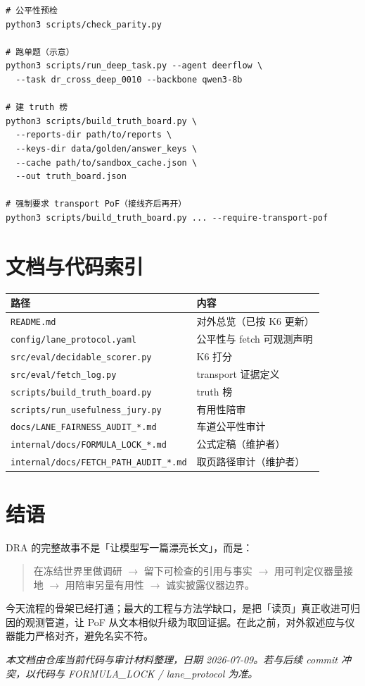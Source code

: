 \documentclass[11pt,a4paper]{article}
\begin{document}
\begin{lstlisting}
# 公平性预检
python3 scripts/check_parity.py

# 跑单题（示意）
python3 scripts/run_deep_task.py --agent deerflow \
  --task dr_cross_deep_0010 --backbone qwen3-8b

# 建 truth 榜
python3 scripts/build_truth_board.py \
  --reports-dir path/to/reports \
  --keys-dir data/golden/answer_keys \
  --cache path/to/sandbox_cache.json \
  --out truth_board.json

# 强制要求 transport PoF（接线齐后再开）
python3 scripts/build_truth_board.py ... --require-transport-pof
\end{lstlisting}

\section{文档与代码索引}

\begin{center}
\begin{tabular}{@{}lp{8.5cm}@{}}
\toprule
路径 & 内容 \\
\midrule
\texttt{README.md} & 对外总览（已按 K6 更新） \\
\texttt{config/lane\_protocol.yaml} & 公平性与 fetch 可观测声明 \\
\texttt{src/eval/decidable\_scorer.py} & K6 打分 \\
\texttt{src/eval/fetch\_log.py} & transport 证据定义 \\
\texttt{scripts/build\_truth\_board.py} & truth 榜 \\
\texttt{scripts/run\_usefulness\_jury.py} & 有用性陪审 \\
\texttt{docs/LANE\_FAIRNESS\_AUDIT\_*.md} & 车道公平性审计 \\
\texttt{internal/docs/FORMULA\_LOCK\_*.md} & 公式定稿（维护者） \\
\texttt{internal/docs/FETCH\_PATH\_AUDIT\_*.md} & 取页路径审计（维护者） \\
\bottomrule
\end{tabular}
\end{center}

\section{结语}

DRA 的完整故事不是「让模型写一篇漂亮长文」，而是：

\begin{quote}
在冻结世界里做调研 $\rightarrow$ 留下可检查的引用与事实 $\rightarrow$ 用可判定仪器量接地 $\rightarrow$ 用陪审另量有用性 $\rightarrow$ 诚实披露仪器边界。
\end{quote}

今天流程的骨架已经打通；最大的工程与方法学缺口，是把「读页」真正收进可归因的观测管道，让 PoF 从文本相似升级为取回证据。在此之前，对外叙述应与仪器能力严格对齐，避免名实不符。

\vspace{1.5em}
\noindent\textit{本文档由仓库当前代码与审计材料整理，日期 2026-07-09。若与后续 commit 冲突，以代码与 FORMULA\_LOCK / lane\_protocol 为准。}
\end{document}
